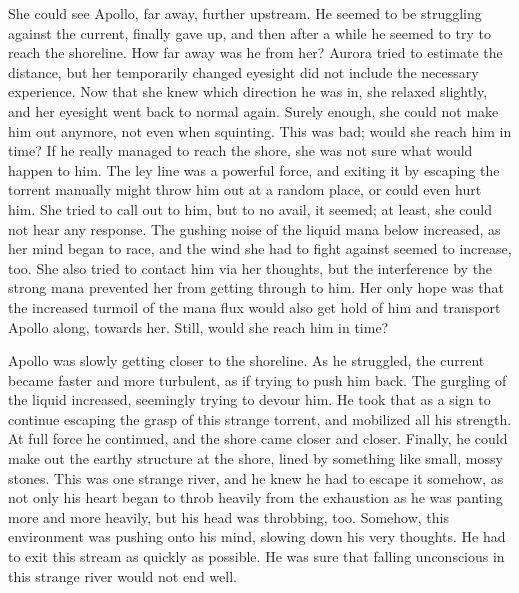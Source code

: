 She could see Apollo, far away, further upstream. He seemed to be struggling against the current, finally gave up, and then after a while he seemed to try to reach the shoreline. How far away was he from her? Aurora tried to estimate the distance, but her temporarily changed eyesight did not include the necessary experience. Now that she knew which direction he was in, she relaxed slightly, and her eyesight went back to normal again. Surely enough, she could not make him out anymore, not even when squinting. This was bad; would she reach him in time? If he really managed to reach the shore, she was not sure what would happen to him. The ley line was a powerful force, and exiting it by escaping the torrent manually might throw him out at a random place, or could even hurt him. She tried to call out to him, but to no avail, it seemed; at least, she could not hear any response. The gushing noise of the liquid mana below increased, as her mind began to race, and the wind she had to fight against seemed to increase, too. She also tried to contact him via her thoughts, but the interference by the strong mana prevented her from getting through to him. Her only hope was that the increased turmoil of the mana flux would also get hold of him and transport Apollo along, towards her. Still, would she reach him in time?

\fancybreaker{}

Apollo was slowly getting closer to the shoreline. As he struggled, the current became faster and more turbulent, as if trying to push him back. The gurgling of the liquid increased, seemingly trying to devour him. He took that as a sign to continue escaping the grasp of this strange torrent, and mobilized all his strength. At full force he continued, and the shore came closer and closer. Finally, he could make out the earthy structure at the shore, lined by something like small, mossy stones. This was one strange river, and he knew he had to escape it somehow, as not only his heart began to throb heavily from the exhaustion as he was panting more and more heavily, but his head was throbbing, too. Somehow, this environment was pushing onto his mind, slowing down his very thoughts. He had to exit this stream as quickly as possible. He was sure that falling unconscious in this strange river would not end well.

